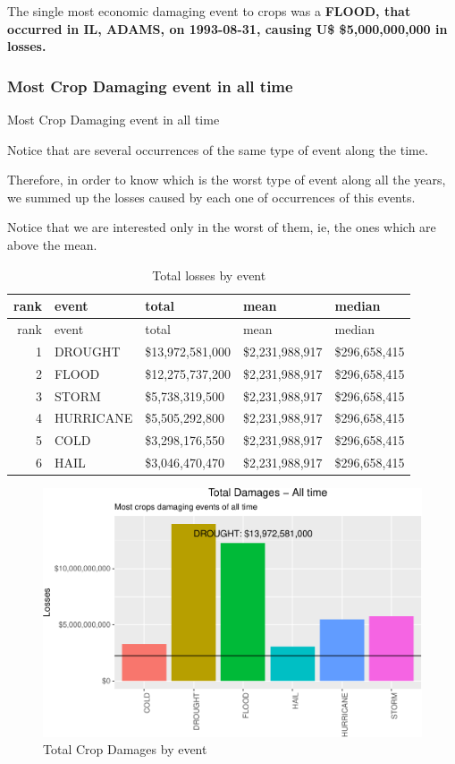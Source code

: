 \documentclass[]{article}
\begin{document}
The single most economic damaging event to crops was a \textbf{FLOOD,
that occurred in IL, ADAMS, on 1993-08-31, causing U\$ \$5,000,000,000
in losses.}

\subsubsection{Most Crop Damaging event in all
time}\label{most-crop-damaging-event-in-all-time}

Most Crop Damaging event in all time

Notice that are several occurrences of the same type of event along the
time.

Therefore, in order to know which is the worst type of event along all
the years, we summed up the losses caused by each one of occurrences of
this events.

Notice that we are interested only in the worst of them, ie, the ones
which are above the mean.

\begin{longtable}[]{@{}rllll@{}}
\caption{Total losses by event}\tabularnewline
\toprule
rank & event & total & mean & median\tabularnewline
\midrule
\endfirsthead
\toprule
rank & event & total & mean & median\tabularnewline
\midrule
\endhead
1 & DROUGHT & \$13,972,581,000 & \$2,231,988,917 &
\$296,658,415\tabularnewline
2 & FLOOD & \$12,275,737,200 & \$2,231,988,917 &
\$296,658,415\tabularnewline
3 & STORM & \$5,738,319,500 & \$2,231,988,917 &
\$296,658,415\tabularnewline
4 & HURRICANE & \$5,505,292,800 & \$2,231,988,917 &
\$296,658,415\tabularnewline
5 & COLD & \$3,298,176,550 & \$2,231,988,917 &
\$296,658,415\tabularnewline
6 & HAIL & \$3,046,470,470 & \$2,231,988,917 &
\$296,658,415\tabularnewline
\bottomrule
\end{longtable}

\begin{figure}[htbp]
\centering
\includegraphics{readme_files/figure-latex/crop-all-plot-1.pdf}
\caption{Total Crop Damages by event}
\end{figure}
\end{document}
